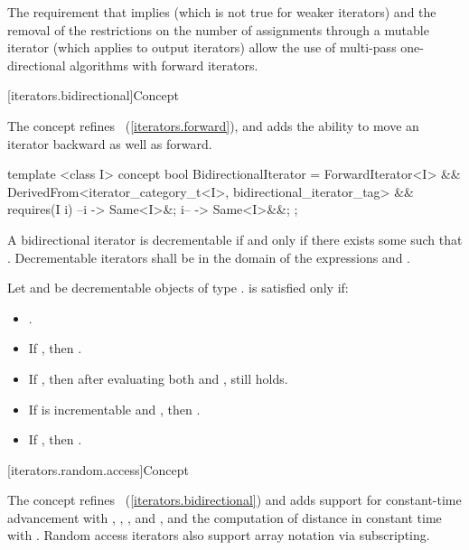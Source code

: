 \pnum
\enternote
The requirement that
implies
(which is not true for weaker iterators)
and the removal of the restrictions on the number of assignments through
a mutable iterator
(which applies to output iterators)
allow the use of multi-pass one-directional algorithms with forward iterators.
\exitnote

[iterators.bidirectional]{Concept }

\pnum
The  concept refines ~(\ref{iterators.forward}),
and adds the ability to move an iterator backward as well as forward.

%
\begin{codeblock}
  template <class I>
  concept bool BidirectionalIterator =
    ForwardIterator<I> &&
    DerivedFrom<iterator_category_t<I>, bidirectional_iterator_tag> &&
    requires(I i) {
      { --i } -> Same<I>&;
      { i-- } -> Same<I>&&;
    };
\end{codeblock}

\pnum
A bidirectional iterator  is decrementable if and only if there exists some  such that
. Decrementable iterators  shall be in the domain of the expressions
 and .

\pnum
Let  and  be decrementable objects of type .
 is satisfied only if:

\begin{itemize}
\item {}.
\item If , then .
\item If , then after evaluating both  and ,
 still holds.
\item If  is incrementable and , then
      .
\item If , then .
\end{itemize}

[iterators.random.access]{Concept }

\pnum
The  concept refines ~(\ref{iterators.bidirectional})
and adds support for constant-time advancement with \tcode{+=}, \tcode{+},  \tcode{-=}, and \tcode{-}, and the
computation of distance in constant time with \tcode{-}. Random access iterators also support array
notation via subscripting.

